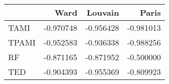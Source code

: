 \begin{tabular}{lrrr}
\toprule
{} &      Ward &   Louvain &     Paris \\
\midrule
TAMI  & -0.970748 & -0.956428 & -0.981013 \\
TPAMI & -0.952583 & -0.936338 & -0.988256 \\
RF    & -0.871165 & -0.871952 & -0.500000 \\
TED   & -0.904393 & -0.955369 & -0.809923 \\
\bottomrule
\end{tabular}
